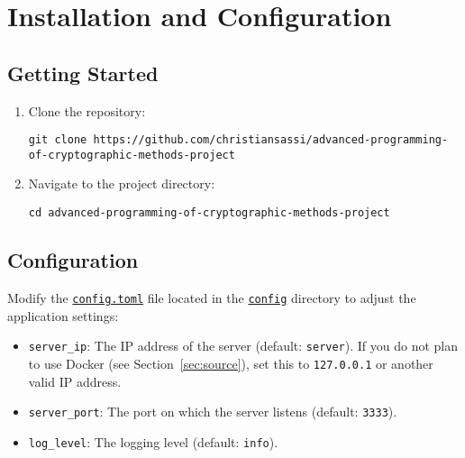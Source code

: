 \chapter{Installation and Configuration}
\label{cha:Installation}

\section{Getting Started}

\begin{enumerate}
    \item Clone the repository:

        \begin{lstlisting}
git clone https://github.com/christiansassi/advanced-programming-of-cryptographic-methods-project
        \end{lstlisting}

    \item Navigate to the project directory:
    
        \begin{lstlisting}
cd advanced-programming-of-cryptographic-methods-project
        \end{lstlisting}
\end{enumerate}

\section{Configuration}

Modify the \href{https://github.com/christiansassi/advanced-programming-of-cryptographic-methods-project/blob/main/config/config.toml}{\texttt{config.toml}} file located in the \href{https://github.com/christiansassi/advanced-programming-of-cryptographic-methods-project/blob/main/config}{\texttt{config}} directory to adjust the application settings:

\begin{itemize}
    \item \texttt{server\_ip}: The IP address of the server (default: \texttt{server}). If you do not plan to use Docker (see Section~\ref{sec:source}), set this to \texttt{127.0.0.1} or another valid IP address.
    \item \texttt{server\_port}: The port on which the server listens (default: \texttt{3333}).
    \item \texttt{log\_level}: The logging level (default: \texttt{info}).
\end{itemize}

